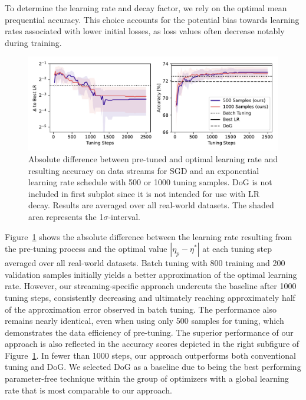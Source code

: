 \documentclass{article} %
\begin{document}
To determine the learning rate and decay factor, we rely on the optimal mean prequential accuracy. This choice accounts for the potential bias towards learning rates associated with lower initial losses, as loss values often decrease notably during training.

\begin{figure}[hb]
   \centering
   \includegraphics[width=\textwidth]{figures/pretune_1x64_acc_lr_exp_schedule.pdf}
   \caption{Absolute difference between pre-tuned and optimal learning rate and resulting accuracy on data streams for SGD and an exponential learning rate schedule with 500 or 1000 tuning samples. DoG is not included in first subplot since it is not intended for use with LR decay. Results are averaged over all real-world datasets. The shaded area represents the 1$\sigma$-interval.}\label{fig:pretune_lr_accuracy}
\end{figure}
Figure~\ref{fig:pretune_lr_accuracy} shows the absolute difference between the learning rate resulting from the pre-tuning process and the optimal value $|\eta_p - \eta^*|$ at each tuning step averaged over all real-world datasets.
Batch tuning with 800 training and 200 validation samples initially yields a better approximation of the optimal learning rate. However, our streaming-specific approach undercuts the baseline after 1000 tuning steps, consistently decreasing and ultimately reaching approximately half of the approximation error observed in batch tuning.
The performance also remains nearly identical, even when using only 500 samples for tuning, which demonstrates the data efficiency of pre-tuning.
The superior performance of our approach is also reflected in the accuracy scores depicted in the right subfigure of Figure~\ref{fig:pretune_lr_accuracy}.
In fewer than 1000 steps, our approach outperforms both conventional tuning and DoG.
We selected DoG as a baseline due to being the best performing parameter-free technique within the group of optimizers with a global learning rate that is most comparable to our approach.
\end{document}
